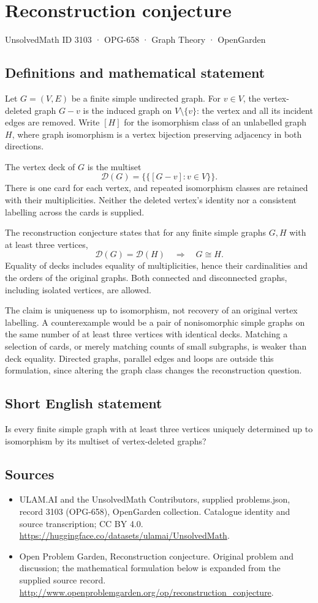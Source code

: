 \documentclass[11pt,a4paper]{article}
\begin{document}
\section*{Reconstruction conjecture}\label{3103}
{\small UnsolvedMath ID 3103 · OPG-658 · Graph Theory · OpenGarden}
\subsection{Definitions and mathematical statement}
Let $G=(V,E)$ be a finite simple undirected graph. For $v\in V$, the
vertex-deleted graph $G-v$ is the induced graph on $V\setminus\{v\}$:
the vertex and all its incident edges are removed. Write $[H]$ for the
isomorphism class of an unlabelled graph $H$, where graph isomorphism is
a vertex bijection preserving adjacency in both directions.

The vertex deck of $G$ is the multiset
\[
 \mathcal D(G)=\{\!\{[G-v]:v\in V\}\!\}.
\]
There is one card for each vertex, and repeated isomorphism classes are
retained with their multiplicities. Neither the deleted vertex's identity
nor a consistent labelling across the cards is supplied.

The reconstruction conjecture states that for any finite simple graphs
$G,H$ with at least three vertices,
\[
 \mathcal D(G)=\mathcal D(H)\quad\Longrightarrow\quad G\cong H.
\]
Equality of decks includes equality of multiplicities, hence their
cardinalities and the orders of the original graphs. Both connected and
disconnected graphs, including isolated vertices, are allowed.

The claim is uniqueness up to isomorphism, not recovery of an original
vertex labelling. A counterexample would be a pair of nonisomorphic
simple graphs on the same number of at least three vertices with identical
decks. Matching a selection of cards, or merely matching counts of small
subgraphs, is weaker than deck equality. Directed graphs, parallel edges
and loops are outside this formulation, since altering the graph class
changes the reconstruction question.
\subsection{Short English statement}
Is every finite simple graph with at least three vertices uniquely determined up to isomorphism by its multiset of vertex-deleted graphs?
\subsection{Sources}
\begin{itemize}
\item[S1] ULAM.AI and the UnsolvedMath Contributors, supplied problems.json, record 3103 (OPG-658), OpenGarden collection. Catalogue identity and source transcription; CC BY 4.0.
\url{https://huggingface.co/datasets/ulamai/UnsolvedMath}.
\item[S2] Open Problem Garden, Reconstruction conjecture. Original problem and discussion; the mathematical formulation below is expanded from the supplied source record.
\url{http://www.openproblemgarden.org/op/reconstruction_conjecture}.
\end{itemize}
\end{document}
